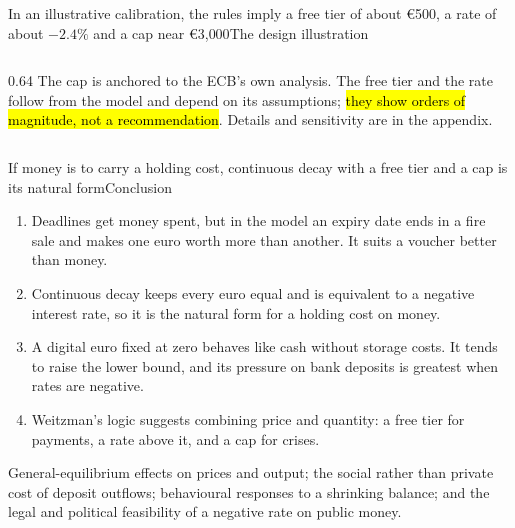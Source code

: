 \documentclass[aspectratio=169,9pt]{beamer}
\begin{document}
\begin{frame}{In an illustrative calibration, the rules imply a free tier of about \euro 500, a rate of about $-2.4\%$ and a cap near \euro 3{,}000}{The design \textperiodcentered{} illustration}
\begin{columns}[c]
\begin{column}{0.64\textwidth}
      \vspace{0.5em}
      \small
      The cap is anchored to the ECB's own analysis. The free tier and the rate follow from the model and depend on its assumptions; \hl{they show orders of magnitude, not a recommendation}. Details and sensitivity are in the appendix.
    \end{column}
  \end{columns}
\end{frame}

\begin{frame}{If money is to carry a holding cost, continuous decay with a free tier and a cap is its natural form}{Conclusion}
  \vspace{0.1cm}
  \begin{enumerate}
    \setlength\itemsep{0.55em}
    \item Deadlines get money spent, but in the model an expiry date ends in a fire sale and makes one euro worth more than another. It suits a voucher better than money.
    \item Continuous decay keeps every euro equal and is equivalent to a negative interest rate, so it is the natural form for a holding cost on money.
    \item A digital euro fixed at zero behaves like cash without storage costs. It tends to raise the lower bound, and its pressure on bank deposits is greatest when rates are negative.
    \item Weitzman's logic suggests combining price and quantity: a free tier for payments, a rate above it, and a cap for crises.
  \end{enumerate}
  \vspace{0.4cm}
  \small
  General-equilibrium effects on prices and output; the social rather than private cost of deposit outflows; behavioural responses to a shrinking balance; and the legal and political feasibility of a negative rate on public money.
\end{frame}

\appendix
\begin{frame}[plain]
  \vfill{}\vfill
\end{frame}
\end{document}
